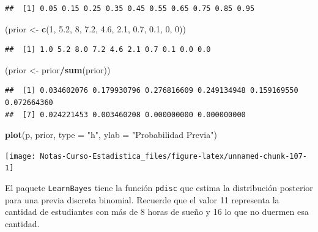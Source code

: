 \documentclass[
  12pt,
]{book}
\newenvironment{Shaded}{\begin{snugshade}}{\end{snugshade}}
\newcommand{\DataTypeTok}[1]{\textcolor[rgb]{0.13,0.29,0.53}{#1}}
\newcommand{\DecValTok}[1]{\textcolor[rgb]{0.00,0.00,0.81}{#1}}
\newcommand{\FloatTok}[1]{\textcolor[rgb]{0.00,0.00,0.81}{#1}}
\newcommand{\KeywordTok}[1]{\textcolor[rgb]{0.13,0.29,0.53}{\textbf{#1}}}
\newcommand{\NormalTok}[1]{#1}
\newcommand{\OperatorTok}[1]{\textcolor[rgb]{0.81,0.36,0.00}{\textbf{#1}}}
\newcommand{\StringTok}[1]{\textcolor[rgb]{0.31,0.60,0.02}{#1}}
\theoremstyle{definition}
\theoremstyle{definition}
\theoremstyle{definition}
\theoremstyle{remark}
\begin{document}
\begin{verbatim}
##  [1] 0.05 0.15 0.25 0.35 0.45 0.55 0.65 0.75 0.85 0.95
\end{verbatim}

\begin{Shaded}
\begin{Highlighting}[]
\NormalTok{(prior <-}\StringTok{ }\KeywordTok{c}\NormalTok{(}\DecValTok{1}\NormalTok{, }\FloatTok{5.2}\NormalTok{, }\DecValTok{8}\NormalTok{, }\FloatTok{7.2}\NormalTok{, }\FloatTok{4.6}\NormalTok{, }\FloatTok{2.1}\NormalTok{, }\FloatTok{0.7}\NormalTok{, }\FloatTok{0.1}\NormalTok{, }\DecValTok{0}\NormalTok{, }
    \DecValTok{0}\NormalTok{))}
\end{Highlighting}
\end{Shaded}

\begin{verbatim}
##  [1] 1.0 5.2 8.0 7.2 4.6 2.1 0.7 0.1 0.0 0.0
\end{verbatim}

\begin{Shaded}
\begin{Highlighting}[]
\NormalTok{(prior <-}\StringTok{ }\NormalTok{prior}\OperatorTok{/}\KeywordTok{sum}\NormalTok{(prior))}
\end{Highlighting}
\end{Shaded}

\begin{verbatim}
##  [1] 0.034602076 0.179930796 0.276816609 0.249134948 0.159169550 0.072664360
##  [7] 0.024221453 0.003460208 0.000000000 0.000000000
\end{verbatim}

\begin{Shaded}
\begin{Highlighting}[]
\KeywordTok{plot}\NormalTok{(p, prior, }\DataTypeTok{type =} \StringTok{"h"}\NormalTok{, }\DataTypeTok{ylab =} \StringTok{"Probabilidad Previa"}\NormalTok{)}
\end{Highlighting}
\end{Shaded}

\begin{center}\texttt{[image: Notas-Curso-Estadistica\_files/figure-latex/unnamed-chunk-107-1]} \end{center}

El paquete \texttt{LearnBayes} tiene la función \texttt{pdisc} que estima la
distribución posterior para una previa discreta binomial. Recuerde que
el valor 11 representa la cantidad de estudiantes con más de 8 horas
de sueño y 16 lo que no duermen esa cantidad.
\end{document}
